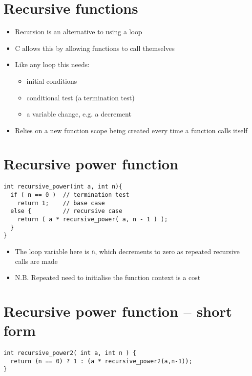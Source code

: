 \documentclass{article}
\begin{document}
\section{Recursive functions}
\begin{itemize}
\item Recursion is an alternative to using a loop

\item C allows this by allowing functions to call themselves

\item Like any loop this needs:
\begin{itemize}
\item initial conditions
\item conditional test (a termination test)
\item a variable change, e.g. a decrement
\end{itemize}

\item Relies on a new function scope being created every time a function calls itself
\end{itemize}



\section{Recursive power function}
\begin{verbatim}
int recursive_power(int a, int n){
  if ( n == 0 )  // termination test
    return 1;    // base case
  else {         // recursive case 
    return ( a * recursive_power( a, n - 1 ) );
  }
}
\end{verbatim}

\begin{itemize}
\item The loop variable here is \verb!n!, which decrements to zero as repeated recursive calls are made
\item N.B. Repeated need to initialise the function context is a cost
\end{itemize}



\section{Recursive power function -- short form}
\begin{verbatim}
int recursive_power2( int a, int n ) {
  return (n == 0) ? 1 : (a * recursive_power2(a,n-1));
}
\end{verbatim}
\end{document}
